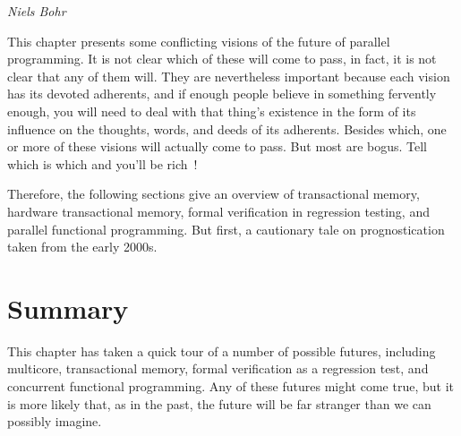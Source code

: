 
%
	 {\emph{Niels Bohr}}

This chapter presents some conflicting visions of the future of parallel
programming.
It is not clear which of these will come to pass, in fact, it is not
clear that any of them will.
They are nevertheless important because each vision has its devoted
adherents, and if enough people believe in something fervently enough,
you will need to deal with that thing's existence in the form of its
influence on the thoughts, words, and deeds of its adherents.
Besides which, one or more of these visions will actually come to pass.
But most are bogus.
Tell which is which and you'll be rich~\cite{KeithRSpitz1977}!

Therefore, the following sections give an overview of transactional
memory, hardware transactional memory,
formal verification in regression testing, and
parallel functional programming.
But first, a cautionary tale on prognostication taken from the early 2000s.







\section{Summary}
\label{sec:future:Summary}

This chapter has taken a quick tour of a number of possible futures,
including multicore, transactional memory, formal verification as
a regression test, and concurrent functional programming.
Any of these futures might come true, but it is more likely that, as in
the past, the future will be far stranger than we can possibly imagine.

